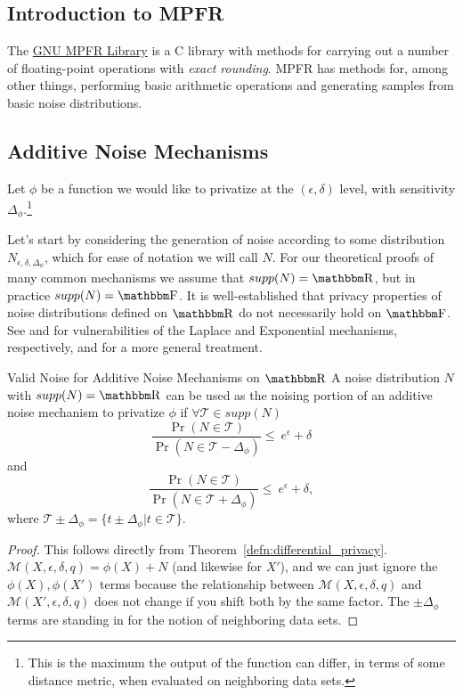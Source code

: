 \documentclass[11pt]{scrartcl} %
\begin{document}
\subsection{Introduction to MPFR}
The \href{https://www.mpfr.org/}{GNU MPFR Library}\cite{FHL+07} is a C library with methods for carrying out a number
of floating-point operations with \emph{exact rounding}.
MPFR has methods for, among other things, performing basic arithmetic operations and generating samples
from basic noise distributions.

\subsection{Additive Noise Mechanisms}
Let $\phi$ be a function we would like to privatize at the $(\epsilon, \delta)$ level,
with sensitivity $\Delta_{\phi}$.\footnote{This is the maximum the output of
the function can differ, in terms of some distance metric, when evaluated on neighboring data sets.} \newline

Let's start by considering the generation of noise according to some distribution $N_{\epsilon, \delta, \Delta_{\phi}}$,
which for ease of notation we will call $N$.
For our theoretical proofs of many common mechanisms we assume that $supp(N) = \R$,
but in practice $supp(N) = \F$. It is well-established that privacy properties
of noise distributions defined on $\R$ do not necessarily hold on $\F$.
See \cite{Mir12} and \cite{Ilv19} for vulnerabilities of the Laplace and Exponential
mechanisms, respectively, and \cite{GMP16} for a more general treatment. \newline

\begin{theorem}
	\label{thm:valid_noise_on_R}
	Valid Noise for Additive Noise Mechanisms on $\R$ \newline
	A noise distribution $N$ with $supp(N) = \R$ can be used as the noising portion of an additive noise mechanism to privatize $\phi$ if
	$\forall \mathcal{T} \in supp(N)$
	\[ \frac{\Pr(N \in \mathcal{T})}{\Pr(N \in \mathcal{T} - \Delta_{\phi})} \leq \ e^{\epsilon} + \delta \]
	and
	\[ \frac{\Pr(N \in \mathcal{T})}{\Pr(N \in \mathcal{T} + \Delta_{\phi})} \leq \ e^{\epsilon} + \delta, \]
	where $\mathcal{T} \pm \Delta_{\phi} = \{t \pm \Delta_{\phi} | t \in \mathcal{T}\}$.

	\begin{proof}
		This follows directly from Theorem~\ref{defn:differential_privacy}.
		$\mathcal{M}(X, \epsilon, \delta, q) = \phi(X) + N$ (and likewise for $X'$),
		and we can just ignore the $\phi(X), \phi(X')$ terms because the relationship between
		$\mathcal{M}(X, \epsilon, \delta, q)$ and $\mathcal{M}(X', \epsilon, \delta, q)$
		does not change if you shift both by the same factor.
		The $\pm \Delta_{\phi}$ terms are standing in for the notion of neighboring data sets.
	\end{proof}
\end{theorem}
\end{document}
